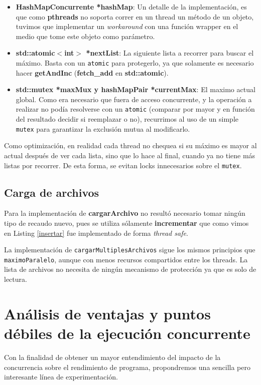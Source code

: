 \documentclass[a4paper]{article}
\begin{document}
\begin{itemize}
    \item \textbf{HashMapConcurrente *hashMap}: Un detalle de la implementación, es que como \textbf{pthreads} no soporta correr en un thread un método de un objeto, tuvimos que implementar un \textit{workaround} con una función wrapper en el medio que tome este objeto como parámetro.
    \item \textbf{std::atomic$<$int$>$ *nextList}: La siguiente lista a recorrer para buscar el máximo. Basta con un \texttt{atomic} para protegerlo, ya que solamente es necesario hacer \textbf{getAndInc} (\textbf{fetch\_add} en \textbf{std::atomic}).
    \item \textbf{std::mutex *maxMux y hashMapPair *currentMax}: El maximo actual global. Como era necesario que fuera de acceso concurrente, y la operación a realizar no podía resolverse con un \texttt{atomic} (comparar por mayor y en función del resultado decidir si reemplazar o no), recurrimos al uso de un simple \texttt{mutex} para garantizar la exclusión mutua al modificarlo.
\end{itemize}
Como optimización, en realidad cada thread no chequea si su máximo es mayor al actual después de ver cada lista, sino que lo hace al final, cuando ya no tiene más listas por recorrer. De esta forma, se evitan locks innecesarios sobre el \texttt{mutex}.

\subsection{Carga de archivos}

Para la implementación de \textbf{cargarArchivo} no resultó necesario tomar ningún tipo de recaudo nuevo, pues se utiliza sólamente \textbf{incrementar} que como vimos en Listing \ref{insertar} fue implementado de forma \textit{thread safe}.

La implementación de \texttt{cargarMultiplesArchivos} sigue los mismos principios que \texttt{maximoParalelo}, aunque con menos recursos compartidos entre los threads. La lista de archivos no necesita de ningún mecanismo de protección ya que es solo de lectura.

\section{Análisis de ventajas y puntos débiles de la ejecución concurrente}

Con la finalidad de obtener un mayor entendimiento del impacto de la concurrencia sobre el rendimiento de programa, propondremos una sencilla pero interesante línea de experimentación.
\end{document}
